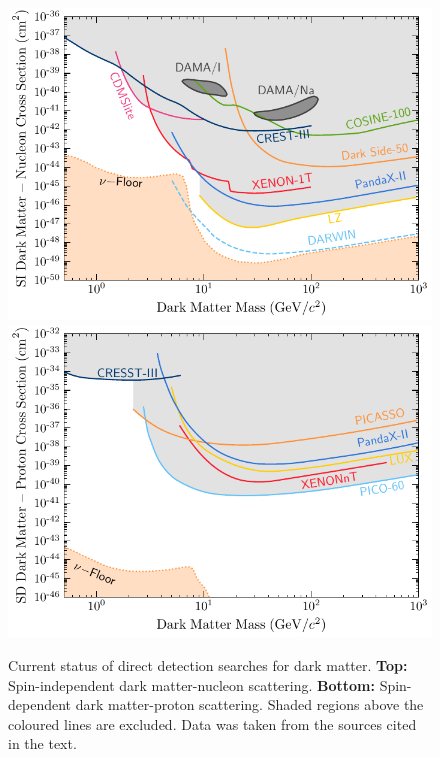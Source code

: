 \begin{figure}
    \centering
    \includegraphics{DM_limits_SI.pdf}
    \includegraphics{DM_limits_SD_p.pdf}
    \caption[Current status of direct detection searches for dark matter.]{Current status of direct detection searches for dark matter. \textbf{Top:} Spin-independent dark matter-nucleon scattering. \textbf{Bottom:} Spin-dependent dark matter-proton scattering. Shaded regions above the coloured lines are excluded. Data was taken from the sources cited in the text.}
    \label{ch1:fig:direct_detection_lims}
\end{figure}

